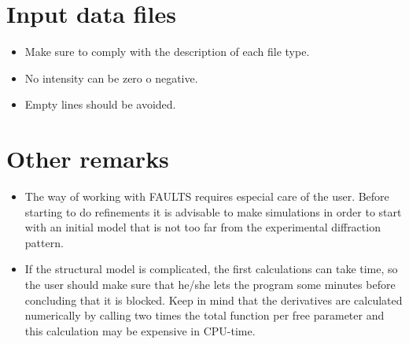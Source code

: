 \section{Input data files}

\begin{itemize}

	\item Make sure to comply with the description of each file type.

	\item No intensity can be zero o negative.

	\item Empty lines should be avoided.

\end{itemize}

\section{Other remarks}

\begin{itemize}

	\item The way of working with FAULTS requires especial care of the user. Before starting to do refinements it is advisable to make simulations in order to start with an initial model that is not too far from the experimental diffraction pattern. 
	
	\item If the structural model is complicated, the first calculations can take time, so the user should make sure that he/she lets the program some minutes before concluding that it is blocked. Keep in mind that the derivatives are calculated numerically by calling two times the total function per free parameter and this calculation may be expensive in CPU-time.

\end{itemize}
 





